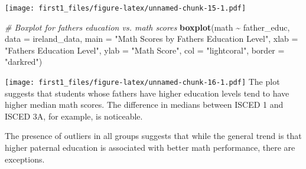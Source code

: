 \documentclass[
]{article}
\newenvironment{Shaded}{\begin{snugshade}}{\end{snugshade}}
\newcommand{\AttributeTok}[1]{\textcolor[rgb]{0.13,0.29,0.53}{#1}}
\newcommand{\CommentTok}[1]{\textcolor[rgb]{0.56,0.35,0.01}{\textit{#1}}}
\newcommand{\FunctionTok}[1]{\textcolor[rgb]{0.13,0.29,0.53}{\textbf{#1}}}
\newcommand{\NormalTok}[1]{#1}
\newcommand{\OtherTok}[1]{\textcolor[rgb]{0.56,0.35,0.01}{#1}}
\newcommand{\SpecialCharTok}[1]{\textcolor[rgb]{0.81,0.36,0.00}{\textbf{#1}}}
\newcommand{\StringTok}[1]{\textcolor[rgb]{0.31,0.60,0.02}{#1}}
\begin{document}
\begin{Shaded}
\end{Shaded}

\texttt{[image: first1\_files/figure-latex/unnamed-chunk-15-1.pdf]}

\begin{Shaded}
\begin{Highlighting}[]
\CommentTok{\# Boxplot for father\textquotesingle{}s education vs. math scores}
\FunctionTok{boxplot}\NormalTok{(math }\SpecialCharTok{\textasciitilde{}}\NormalTok{ father\_educ, }\AttributeTok{data =}\NormalTok{ ireland\_data, }
        \AttributeTok{main =} \StringTok{"Math Scores by Father\textquotesingle{}s Education Level"}\NormalTok{,}
        \AttributeTok{xlab =} \StringTok{"Father\textquotesingle{}s Education Level"}\NormalTok{, }\AttributeTok{ylab =} \StringTok{"Math Score"}\NormalTok{,}
        \AttributeTok{col =} \StringTok{"lightcoral"}\NormalTok{, }\AttributeTok{border =} \StringTok{"darkred"}\NormalTok{)}
\end{Highlighting}
\end{Shaded}

\texttt{[image: first1\_files/figure-latex/unnamed-chunk-16-1.pdf]} The
plot suggests that students whose fathers have higher education levels
tend to have higher median math scores. The difference in medians
between ISCED 1 and ISCED 3A, for example, is noticeable.

The presence of outliers in all groups suggests that while the general
trend is that higher paternal education is associated with better math
performance, there are exceptions.
\end{document}
